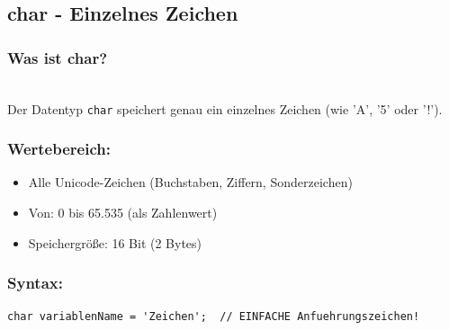\subsection*{char - Einzelnes Zeichen}

\subsubsection*{Was ist char?}\\
Der Datentyp \texttt{char} speichert genau ein einzelnes Zeichen (wie 'A', '5' oder '!').

\subsubsection*{Wertebereich:}
\begin{itemize}
	\item Alle Unicode-Zeichen (Buchstaben, Ziffern, Sonderzeichen)
	\item Von: 0 bis 65.535 (als Zahlenwert)
	\item Speichergröße: 16 Bit (2 Bytes)
\end{itemize}

\subsubsection*{Syntax:}
\begin{lstlisting}
char variablenName = 'Zeichen';  // EINFACHE Anfuehrungszeichen!
\end{lstlisting}


